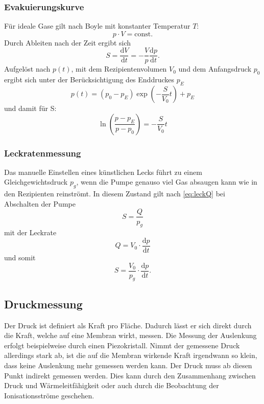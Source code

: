 \subsubsection{Evakuierungskurve}
Für ideale Gase gilt nach Boyle\cite{boyle} mit konstanter Temperatur $T$:
\begin{equation*}
    p\cdot V = \text{const.}
\end{equation*}
Durch Ableiten nach der Zeit ergibt sich
\begin{equation*}
    S = \frac{\text{d}V}{\text{d}t} = -\frac{V}{p}\frac{\text{d}p}{\text{d}t}.
\end{equation*}
Aufgelöst nach $p(t)$, mit dem Rezipientenvolumen $V_0$ und dem Anfangsdruck $p_0$ ergibt sich unter der Berücksichtigung des Enddruckes $p_E$
\begin{equation*}
    p(t)=(p_0-p_E)\exp\left(-\frac{S}{V_0}t\right) + p_E
\end{equation*}
und damit für S:
\begin{equation}
    \ln\left(\frac{p-p_E}{p-p_0}\right) = -\frac{S}{V_0}t
    \label{eq:evacSaug}
\end{equation}

\subsubsection{Leckratenmessung}
Das manuelle Einstellen eines künstlichen Lecks führt zu einem Gleichgewichtsdruck $p_g$, wenn die Pumpe genauso viel Gas absaugen kann wie in den Rezipienten reinströmt.
In diesem Zustand gilt nach \autoref{eq:leckQ} bei Abschalten der Pumpe
\begin{equation*}
    S = \frac{Q}{p_g}
\end{equation*}
mit der Leckrate
\begin{equation*}
    Q = V_0 \cdot\frac{\text{d}p}{\text{d}t}
\end{equation*}
und somit
\begin{equation}
    S = \frac{V_0}{p_g}\cdot\frac{\text{d}p}{\text{d}t}.
    \label{eq:leckSaug}
\end{equation}



\subsection{Druckmessung}
Der Druck ist definiert als Kraft pro Fläche.
Dadurch lässt er sich direkt durch die Kraft, 
welche auf eine Membran wirkt, messen.
Die Messung der Auslenkung erfolgt beispielweise durch einen Piezokristall.
Nimmt der gemessene Druck allerdings stark ab,
ist die auf die Membran wirkende Kraft irgendwann so klein, 
dass keine Auslenkung mehr gemessen werden kann.
Der Druck muss ab diesen Punkt indirekt gemessen werden.
Dies kann durch den Zusammenhang zwischen Druck und Wärmeleitfähigkeit
oder auch durch die Beobachtung der Ionisationsströme geschehen.

